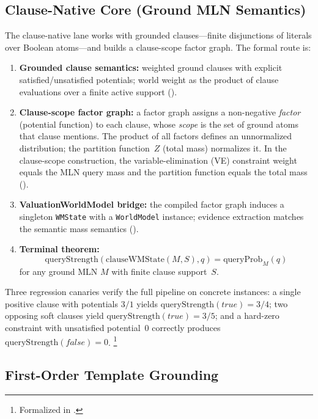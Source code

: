 \documentclass[11pt,openany]{report}
\begin{document}
\subsection{Clause-Native Core (Ground MLN Semantics)}

The clause-native lane works with grounded clauses---finite disjunctions
of literals over Boolean atoms---and builds a clause-scope factor graph.
The formal route is:
\begin{enumerate}
\item \textbf{Grounded clause semantics:} weighted ground clauses with
  explicit satisfied/unsatisfied potentials; world weight as the product
  of clause evaluations over a finite active support
  ().
\item \textbf{Clause-scope factor graph:} a factor graph assigns a
  non-negative \emph{factor} (potential function) to each clause, whose
  \emph{scope} is the set of ground atoms that clause mentions.  The
  product of all factors defines an unnormalized distribution; the
  partition function~$Z$ (total mass) normalizes it.  In the
  clause-scope construction, the variable-elimination (VE) constraint
  weight equals the MLN query mass and the partition function equals
  the total mass
  ().
\item \textbf{ValuationWorldModel bridge:} the compiled factor graph
  induces a singleton \texttt{WMState} with a \texttt{WorldModel} instance;
  evidence extraction matches the semantic mass semantics
  ().
\item \textbf{Terminal theorem:}
  \[
    \mathrm{queryStrength}(\mathrm{clauseWMState}(M, S), q)
      = \mathrm{queryProb}_{M}(q)
  \]
  for any ground MLN $M$ with finite clause support~$S$.
\end{enumerate}

Three regression canaries verify the full pipeline on concrete instances:
a single positive clause with potentials $3/1$ yields
$\mathrm{queryStrength}(\textit{true}) = 3/4$; two opposing soft clauses
yield $\mathrm{queryStrength}(\textit{true}) = 3/5$; and a hard-zero
constraint with unsatisfied potential~$0$ correctly produces
$\mathrm{queryStrength}(\textit{false}) = 0$.%
\footnote{Formalized in .}

\subsection{First-Order Template Grounding}
\end{document}
